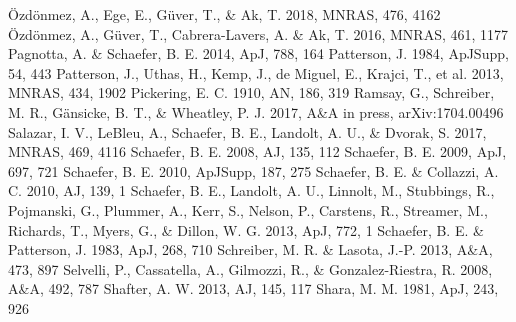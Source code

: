 \documentclass[a4paper,fleqn,usenatbib]{mnras}
\begin{document}
\begin{thebibliography}{99}
 \"{O}zd\"{o}nmez, A., Ege, E., G\"{u}ver, T., \& Ak, T. 2018, MNRAS, 476, 4162
 \"{O}zd\"{o}nmez, A., G\"{u}ver, T., Cabrera-Lavers, A. \& Ak, T. 2016, MNRAS, 461, 1177
 Pagnotta, A. \& Schaefer, B. E.  2014, ApJ, 788, 164
 Patterson, J.  1984, ApJSupp, 54, 443
Patterson, J., Uthas, H., Kemp, J., de Miguel, E., Krajci, T., et al. 2013, MNRAS, 434, 1902
 Pickering, E. C.  1910, AN, 186, 319
 Ramsay, G., Schreiber, M. R., G\"{a}nsicke, B. T., \& Wheatley, P. J. 2017, A\&A in press, arXiv:1704.00496
 Salazar, I. V., LeBleu, A., Schaefer, B. E., Landolt, A. U., \& Dvorak, S. 2017, MNRAS, 469, 4116
 Schaefer, B. E.  2008, AJ, 135, 112
 Schaefer, B. E.  2009, ApJ, 697, 721
 Schaefer, B. E.  2010, ApJSupp, 187, 275
 Schaefer, B. E. \& Collazzi, A. C.  2010, AJ, 139, 1
 Schaefer, B. E., Landolt, A. U., Linnolt, M., Stubbings, R., Pojmanski, G., Plummer, A., Kerr, S., Nelson, P., Carstens, R., Streamer, M., Richards, T., Myers, G., \& Dillon, W. G.  2013, ApJ, 772, 1
 Schaefer, B. E. \& Patterson, J.  1983, ApJ, 268, 710
 Schreiber, M. R. \& Lasota, J.-P.  2013, A\&A, 473, 897
 Selvelli, P., Cassatella, A., Gilmozzi, R., \& Gonzalez-Riestra, R. 2008, A\&A, 492, 787
 Shafter, A. W.  2013, AJ, 145, 117
 Shara, M. M. 1981, ApJ, 243, 926

\end{thebibliography}
\end{document}
